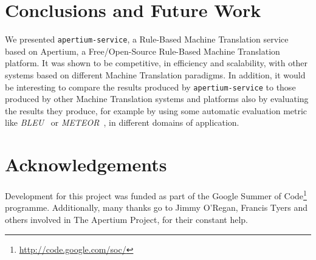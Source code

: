 \documentclass[11pt]{article}
\begin{document}
\section{Conclusions and Future Work}

We presented {\tt apertium-service}, a Rule-Based Machine Translation service based on Apertium, a Free/Open-Source Rule-Based Machine Translation platform. It was shown to be competitive, in efficiency and scalability, with other systems based on different Machine Translation paradigms. In addition, it would be interesting to compare the results produced by {\tt apertium-service} to those produced by other Machine Translation systems and platforms also by evaluating the results they produce, for example by using some automatic evaluation metric like \emph{BLEU}~\citep{bleu} or \emph{METEOR}~\citep{meteor}, in different domains of application.


\section*{Acknowledgements}

Development for this project was funded as part of the Google Summer of Code\footnote{\url{http://code.google.com/soc/}} programme. 
Additionally, many thanks go to Jimmy O'Regan, Francis Tyers and others involved in The Apertium Project, for their constant help.




\end{document}
